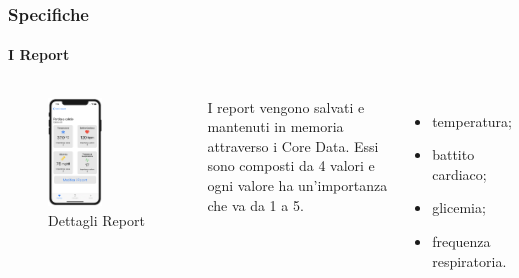 \documentclass{beamer}
\begin{document}
\begin{frame}
\frametitle{Specifiche}
\framesubtitle{I Report}	   
\begin{columns}
	\centering 
	\begin{figure}[h]
	\includegraphics[width=0.55\textwidth]{../img/ReportView1.png}
	\caption{Dettagli Report}
	\end{figure}
	
I report vengono salvati e mantenuti in memoria attraverso i Core Data. Essi sono composti da 4 valori e ogni valore ha un’importanza che va da 1 a 5.\\
\vspace{0.3cm}
\begin{itemize}
  \item temperatura;
  \item battito cardiaco;
  \item glicemia;
  \item frequenza respiratoria.
\end{itemize}
\end{columns}
\end{frame}
\end{document}
